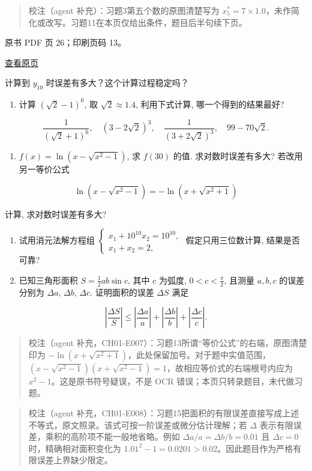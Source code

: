\begin{quote}
校注（agent 补充）：习题3第五个数的原图清楚写为 \(x_5^*=7\times1.0\)，未作简化或改写。习题11在本页仅给出条件，题目后半句续下页。
\end{quote}

\clearpage

原书 PDF 页 26；印刷页码 13。

\href{source-images/pdf-026.jpeg}{查看原页}

计算到 \(y_{10}\) 时误差有多大？这个计算过程稳定吗？

\begin{enumerate}
\def\labelenumi{\arabic{enumi}.}
\setcounter{enumi}{11}
\tightlist
\item
  计算 \((\sqrt{2}-1)^6\), 取 \(\sqrt{2} \approx 1.4\), 利用下式计算, 哪一个得到的结果最好?
\end{enumerate}

\[
\frac{1}{(\sqrt{2}+1)^6}, \quad (3-2\sqrt{2})^3, \quad \frac{1}{(3+2\sqrt{2})^3}, \quad 99-70\sqrt{2}.
\]

\begin{enumerate}
\def\labelenumi{\arabic{enumi}.}
\setcounter{enumi}{12}
\tightlist
\item
  \(f(x)=\ln(x-\sqrt{x^2-1})\), 求 \(f(30)\) 的值. 求对数时误差有多大? 若改用另一等价公式
\end{enumerate}

\[
\ln(x-\sqrt{x^2-1})=-\ln(x+\sqrt{x^2+1})
\]

计算, 求对数时误差有多大?

\begin{enumerate}
\def\labelenumi{\arabic{enumi}.}
\setcounter{enumi}{13}
\item
  试用消元法解方程组 \(\begin{cases} x_1+10^{10}x_2=10^{10}, \\ x_1+x_2=2, \end{cases}\) 假定只用三位数计算, 结果是否可靠?
\item
  已知三角形面积 \(S=\frac{1}{2}ab\sin c\), 其中 \(c\) 为弧度, \(0<c<\frac{\pi}{2}\), 且测量 \(a, b, c\) 的误差分别为 \(\Delta a\), \(\Delta b\), \(\Delta c\). 证明面积的误差 \(\Delta S\) 满足
\end{enumerate}

\[
\left|\frac{\Delta S}{S}\right| \leqslant \left|\frac{\Delta a}{a}\right| + \left|\frac{\Delta b}{b}\right| + \left|\frac{\Delta c}{c}\right|.
\]

\begin{quote}
校注（agent 补充，CH01-E007）：习题13所谓``等价公式''的右端，原图清楚印为 \(-\ln(x+\sqrt{x^2+1})\)，此处保留加号。对于题中实值范围，\((x-\sqrt{x^2-1})(x+\sqrt{x^2-1})=1\)，故相应等价式的右端根号内应为 \(x^2-1\)。这是原书符号疑误，不是 OCR 错误；本页只转录题目，未代做习题。
\end{quote}

\begin{quote}
校注（agent 补充，CH01-E008）：习题15把面积的有限误差直接写成上述不等式，原文照录。该式可按一阶误差或微分估计理解；若 \(\Delta\) 表示有限误差，乘积的高阶项不能一般地省略。例如 \(\Delta a/a=\Delta b/b=0.01\) 且 \(\Delta c=0\) 时，精确相对面积变化为 \(1.01^2-1=0.0201>0.02\)。因此题目作为严格有限误差上界缺少限定。
\end{quote}

